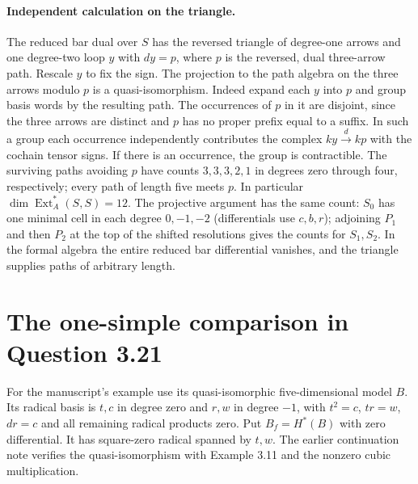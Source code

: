 \documentclass[11pt]{article}
\newcommand{\Ext}{\operatorname{Ext}}
\begin{document}
\paragraph{Independent calculation on the triangle.}
The reduced bar dual over $S$ has the reversed triangle of degree-one
arrows and one degree-two loop $y$ with $dy=p$, where $p$ is the
reversed, dual three-arrow path. Rescale $y$ to fix the sign. The projection
to the path algebra on the three arrows modulo $p$ is a quasi-isomorphism.
Indeed expand each $y$ into $p$ and group basis words by the resulting
path. The occurrences of $p$ in it are disjoint, since the three arrows
are distinct and $p$ has no proper prefix equal to a suffix. In such a
group each occurrence independently contributes the complex
$ky\xrightarrow{d} kp$ with the cochain tensor signs. If there is an
occurrence, the group is contractible. The surviving paths avoiding $p$
have counts $3,3,3,2,1$ in degrees zero through four, respectively;
every path of length five meets $p$. In particular $\dim\Ext_A^*(S,S)=12$.
The projective argument has the same count: $S_0$ has one minimal cell
in each degree $0,-1,-2$ (differentials use $c,b,r$); adjoining $P_1$
and then $P_2$ at the top of the shifted resolutions gives the counts for
$S_1,S_2$. In the formal algebra the entire reduced bar differential
vanishes, and the triangle supplies paths of arbitrary length.

\section{The one-simple comparison in Question 3.21}
For the manuscript's example use its quasi-isomorphic five-dimensional
model $B$. Its radical basis is $t,c$ in degree zero and $r,w$ in degree
$-1$, with $t^2=c$, $tr=w$, $dr=c$ and all remaining radical products
zero. Put $B_f=H^*(B)$ with zero differential. It has square-zero
radical spanned by $t,w$. The earlier continuation note verifies the
quasi-isomorphism with Example 3.11 and the nonzero cubic multiplication.
\end{document}
